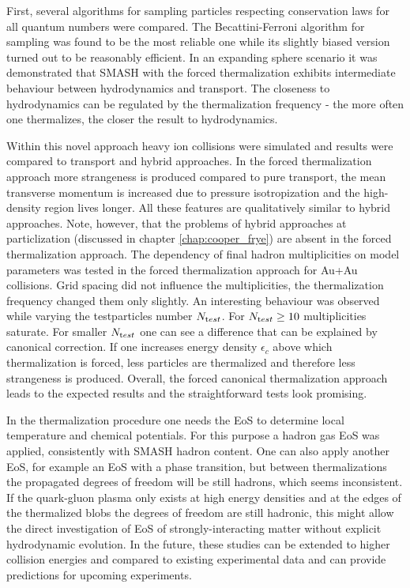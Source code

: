 First, several algorithms for sampling particles respecting conservation laws
for all quantum numbers were compared. The Becattini-Ferroni algorithm for
sampling was found to be the most reliable one while its slightly biased version
turned out to be reasonably efficient. In an expanding sphere scenario it was
demonstrated that SMASH with the forced thermalization exhibits intermediate
behaviour between hydrodynamics and transport. The closeness to hydrodynamics
can be regulated by the thermalization frequency - the more often one thermalizes,
the closer the result to hydrodynamics.

Within this novel approach heavy ion collisions were simulated and results were
compared to transport and hybrid approaches. In the forced thermalization approach
more strangeness is produced compared to pure transport, the mean transverse momentum
is increased due to pressure isotropization and the high-density region lives
longer. All these features are qualitatively similar to hybrid approaches.
Note, however, that the problems of hybrid approaches at particlization (discussed
in chapter \ref{chap:cooper_frye}) are absent in the forced thermalization
approach. The dependency of final hadron multiplicities on model parameters was tested
in the forced thermalization approach for Au+Au collisions. Grid spacing did not
influence the multiplicities, the thermalization frequency changed them only slightly.
An interesting behaviour was observed while varying the testparticles number $N_{\textrm test}$.
For $N_{\textrm test} \geq 10$ multiplicities saturate. For smaller $N_{\textrm test}$ one can see a
difference that can be explained by canonical correction. If one increases energy
density $\epsilon_c$ above which thermalization is forced, less particles are
thermalized and therefore less strangeness is produced. Overall, the forced
canonical thermalization approach leads to the expected results and the
straightforward tests look promising.

In the thermalization procedure one needs the EoS to determine local
temperature and chemical potentials. For this purpose a hadron gas EoS was applied,
consistently with SMASH hadron content. One can also apply another EoS,
for example an EoS with a phase transition, but between thermalizations the
propagated degrees of freedom will be still hadrons, which seems inconsistent.
If the quark-gluon plasma only exists at high energy densities and at the edges
of the thermalized blobs the degrees of freedom are still hadronic, this might
allow the direct investigation of EoS of strongly-interacting matter without
explicit hydrodynamic evolution. In the future, these studies can be extended
to higher collision energies and compared to existing experimental data and
can provide predictions for upcoming experiments.